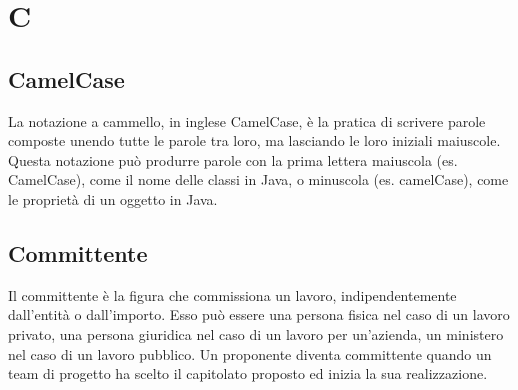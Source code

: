 \section{C}

    \subsection*{CamelCase}

        La notazione a cammello, in inglese CamelCase, è la pratica di scrivere parole composte unendo tutte le parole
        tra loro, ma lasciando le loro iniziali maiuscole. Questa notazione può produrre parole con la prima lettera
        maiuscola (es. CamelCase), come il nome delle classi in Java, o minuscola (es. camelCase), come le proprietà di
        un oggetto in Java.
        
    \subsection*{Committente}

        Il committente è la figura che commissiona un lavoro, indipendentemente dall'entità o dall'importo.
        Esso può essere una persona fisica nel caso di un lavoro privato, una persona giuridica nel caso di un
        lavoro per un'azienda, un ministero nel caso di un lavoro pubblico.
        Un proponente diventa committente quando un team di progetto ha scelto il capitolato proposto
        ed inizia la sua realizzazione.
